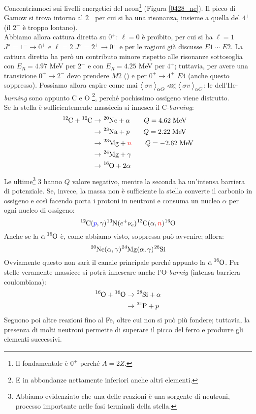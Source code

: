 \noindent Concentriamoci sui livelli energetici del neon\footnote{Il fondamentale è $0^+$ perché $A=2Z$.} (Figura \ref{0428_ne}). Il picco di Gamow si trova intorno al $2^-$ per cui si ha una risonanza, insieme a quella del $4^+$ (il $2^+$ è troppo lontano).\\
\noindent Abbiamo allora cattura diretta su $0^+$: $\ell=0$ è proibito, per cui si ha $\ell=1$ $J^\pi=1^-\to0^+$ e $\ell=2$ $J^\pi=2^+\to0^+$ e per le ragioni già discusse $E1\sim E2$. La cattura diretta ha però un contributo minore rispetto alle risonanze sottosoglia con $E_R =4.97$ MeV per $2^-$ e con $E_R =4.25$ MeV per $4^+$; tuttavia, per avere una transizione $0^+\to2^-$ devo prendere $M2$ () e per $0^+\to4^+$ $E4$ (anche questo soppresso). Possiamo allora capire come mai $\bigl\langle\, \sigma v\, \bigr\rangle_{\alpha O}\lll\bigl\langle\, \sigma v\, \bigr\rangle_{\alpha C}$: le  dell'He-\textit{burning} sono appunto C e O \footnote{E in abbondanze nettamente inferiori anche altri elementi.}, perché pochissimo ossigeno viene distrutto. \\ 
Se la stella è sufficientemente massiccia si innesca il C-\textit{burning}:
\begin{align*}
	\ce{^{12}C} +\ce{^{12}C} &\to \ce{^{20}Ne}+ \alpha \qquad Q=4.62 \unit{MeV} \\
	&\to \ce{^{23}Na}+ p \qquad Q=2.22 \unit{MeV} \\ 
	&\to \ce{^{23}Mg}+ \textcolor{red}{n} \qquad Q=-2.62 \unit{MeV} \\ 
	&\to \ce{^{24}Mg}+ \gamma \\ 
	&\to \ce{^{16}O}+ 2\alpha  
\end{align*}
Le ultime\footnote{Abbiamo evidenziato che una delle reazioni è una sorgente di neutroni, processo importante nelle fasi terminali della stella.} 3 hanno $Q$ valore negativo, mentre la seconda ha un'intensa barriera di potenziale. Se, invece, la massa non è sufficiente la stella converte il carbonio in ossigeno e così facendo porta i protoni in neutroni e consuma un nucleo $\alpha$ per ogni nucleo di ossigeno:
$$\ce{^{12}C}(\textcolor{blue}{p},\gamma)\ce{^{13}N}(e^+\nu_e)\ce{^{13}C}(\alpha,\textcolor{red}{n})\ce{^{16}O}$$
Anche se la $\alpha \, \ce{^{16}O}$ è, come abbiamo visto, soppressa può avvenire; allora:
$$\ce{^{20}Ne}(\alpha,\gamma)\ce{^{24}Mg}(\alpha,\gamma)\ce{^{28}Si}$$
Ovviamente questo non sarà il canale principale perché appunto la $\alpha \, \ce{^{16}O}$. Per stelle veramente massicce si potrà innescare anche l'O-\textit{burnig} (intensa barriera coulombiana):
\begin{align*}
	\ce{^{16}O} + \ce{^{16}O} &\to \ce{^{28}Si} +\alpha \\
	&\to \ce{^{31}P} + p
\end{align*}
Seguono poi altre reazioni fino al Fe, oltre cui non si può più fondere; tuttavia, la presenza di molti neutroni permette di superare il picco del ferro e produrre gli elementi successivi.


